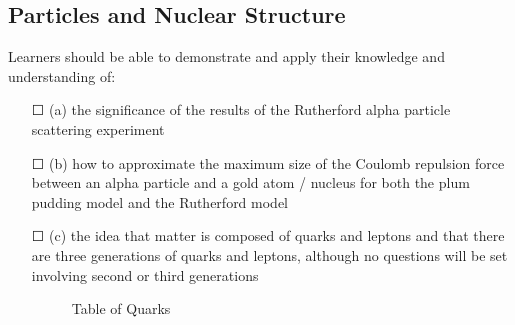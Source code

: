 \subsection{Particles and Nuclear Structure}Learners should be able to demonstrate and apply their knowledge and
understanding of:
\begin{itemize}
	\item[\Large{$\Square$}](a) the significance of the results of the Rutherford alpha particle scattering experiment
	\item[\Large{$\Square$}](b) how to approximate the maximum size of the Coulomb repulsion force
	between an alpha particle and a gold atom / nucleus for both the plum pudding model and the Rutherford model
	\item[\Large{$\Square$}](c) the idea that matter is composed of quarks and leptons and that there are three generations of quarks and leptons, although no questions will be set involving second or third generations 
	\begin{figure}
		 \caption{Table of Quarks}
	\end{figure}
	

\end{itemize}
